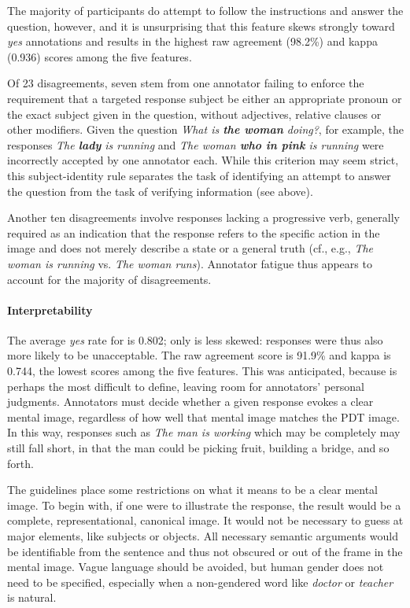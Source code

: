 The majority of participants do attempt to follow the instructions and answer the question, however, and it is unsurprising that this feature skews strongly toward \textit{yes} annotations and results in the highest raw agreement (98.2\%) and kappa (0.936) scores among the five features.

Of 23 disagreements, seven stem from one annotator failing to enforce the requirement that a targeted response subject be either an appropriate pronoun or the exact subject given in the question, without adjectives, relative clauses or other modifiers. Given the question \textit{What is \textbf{the woman} doing?}, for example, the responses \textit{The \textbf{lady} is running} and \textit{The woman \textbf{who in pink} is running} were incorrectly accepted by one annotator each.  While this criterion may seem strict, this subject-identity rule separates the task of identifying an attempt to answer the question from the task of verifying information (see  above).

Another ten disagreements involve responses lacking a progressive verb, generally required as an indication that the response refers to the specific action in the image and does not merely describe a state or a general truth (cf., e.g., \textit{The woman is running} vs. \textit{The woman runs}). Annotator fatigue thus appears to account for the majority of  disagreements.

\paragraph{Interpretability} The average \textit{yes} rate for  is 0.802; only  is less skewed: responses were thus also more likely to be unacceptable.
%
The raw agreement score is 91.9\% and kappa is 0.744, the lowest scores among the five features. This was anticipated, because  is perhaps the most difficult to define, leaving room for annotators' personal judgments. Annotators must decide whether a given response evokes a clear mental image, regardless of how well that mental image matches the PDT image.  In this way, responses such as \textit{The man is working} which may %
be completely  may still fall short, in that the man could be picking fruit, building a bridge, and so forth.

The guidelines place some restrictions on what it means to be a clear mental image. To begin with, if one were to illustrate the response, the result would be a complete, representational, canonical image. It would not be necessary to guess at major elements, like subjects or objects. 
%
All necessary semantic arguments would be identifiable from the sentence and thus not obscured or out of the frame in the mental image.
%
Vague language should be avoided, but human gender does not need to be specified, especially when a non-gendered word like \textit{doctor} or \textit{teacher} is natural. 

